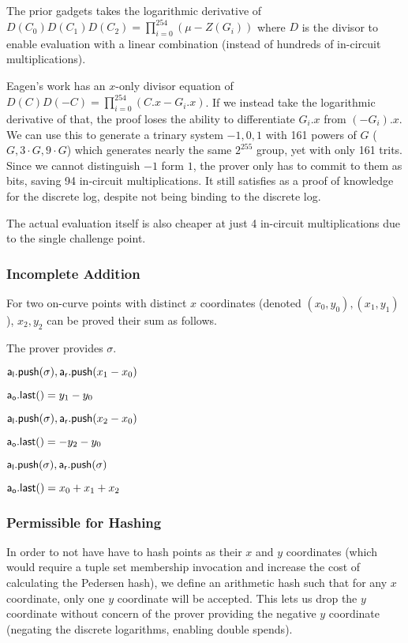 \documentclass[]{article}
\begin{document}
The prior gadgets takes the logarithmic derivative of $D(C_0)D(C_1)D(C_2) = \prod_{i=0}^{254}(\mu - Z(G_i))$ where $D$ is the divisor to enable evaluation with a linear combination (instead of hundreds of in-circuit multiplications).

Eagen's work has an $x$-only divisor equation of $D(C)D(-C) = \prod_{i=0}^{254}(C.x - G_i.x)$. If we instead take the logarithmic derivative of that, the proof loses the ability to differentiate $G_i.x$ from $(-G_i).x$. We can use this to generate a trinary system $-1, 0, 1$ with 161 powers of $G$ ($G, 3 \cdot G, 9 \cdot G$) which generates nearly the same $2^{255}$ group, yet with only 161 trits. Since we cannot distinguish $-1$ form $1$, the prover only has to commit to them as bits, saving 94 in-circuit multiplications. It still satisfies as a proof of knowledge for the discrete log, despite not being binding to the discrete log.

The actual evaluation itself is also cheaper at just 4 in-circuit multiplications due to the single challenge point.

\subsubsection{Incomplete Addition}

For two on-curve points with distinct $x$ coordinates (denoted $(x_0, y_0), (x_1, y_1)$), $x_2, y_2$ can be proved their sum as follows.

The prover provides $\sigma$.

$\mathsf{a_l.push}(\sigma), \mathsf{a_r.push}(x_1 - x_0)$

$\mathsf{a_o.last()} = y_1 - y_0$

$\mathsf{a_l.push}(\sigma), \mathsf{a_r.push}(x_2 - x_0)$

$\mathsf{a_o.last()} = -y_2 - y_0$

$\mathsf{a_l.push}(\sigma), \mathsf{a_r.push}(\sigma)$

$\mathsf{a_o.last()} = x_0 + x_1 + x_2$

\subsubsection{Permissible for Hashing}

In order to not have have to hash points as their $x$ and $y$ coordinates (which would require a tuple set membership invocation and increase the cost of calculating the Pedersen hash), we define an arithmetic hash such that for any $x$ coordinate, only one $y$ coordinate will be accepted. This lets us drop the $y$ coordinate without concern of the prover providing the negative $y$ coordinate (negating the discrete logarithms, enabling double spends).
\end{document}
